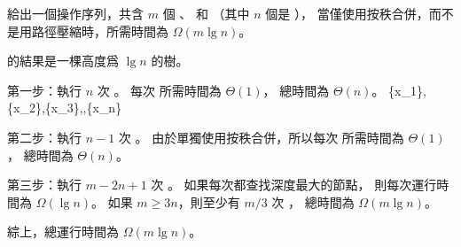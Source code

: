 \startEXERCISE
給出一個操作序列，共含 $m$ 個 、  和 
（其中 $n$ 個是 ），
當僅使用按秩合併，而不是用路徑壓縮時，所需時間為 $\Omega(m\lg n)$。
\stopEXERCISE

\startANSWER
{} 的結果是一棵高度爲 $\lg n$ 的樹。

第一步：執行 $n$ 次 。
每次  所需時間為 $\Theta(1)$，
總時間為 $\Theta(n)$。
\startformula
\{x_1\},\{x_2\},\{x_3\},\cdots,\{x_n\}
\stopformula

第二步：執行 $n-1$ 次 。
由於單獨使用按秩合併，所以每次  所需時間為 $\Theta(1)$，
總時間為 $\Theta(n)$。

第三步：執行 $m-2n+1$ 次 。
如果每次都查找深度最大的節點，
則每次運行時間為 $\Omega(\lg n)$。
如果 $m\ge 3n$，則至少有 $m/3$ 次 ，
總時間為 $\Omega(m\lg n)$。

綜上，總運行時間為 $\Omega(m\lg n)$。
\stopANSWER
